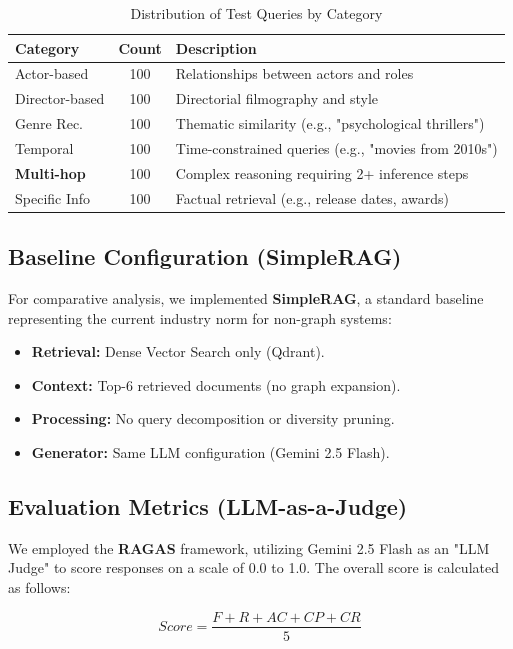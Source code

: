 \documentclass[a4paper, 12pt]{extreport}
\begin{document}
\begin{table}[h]
\centering
\caption{Distribution of Test Queries by Category}
\label{tab:test_dataset}
\begin{tabular}{|l|c|l|}
\hline
\textbf{Category} & \textbf{Count} & \textbf{Description} \\ \hline
Actor-based & 100 & Relationships between actors and roles \\ \hline
Director-based & 100 & Directorial filmography and style \\ \hline
Genre Rec. & 100 & Thematic similarity (e.g., "psychological thrillers") \\ \hline
Temporal & 100 & Time-constrained queries (e.g., "movies from 2010s") \\ \hline
\textbf{Multi-hop} & 100 & Complex reasoning requiring 2+ inference steps \\ \hline
Specific Info & 100 & Factual retrieval (e.g., release dates, awards) \\ \hline
\end{tabular}
\end{table}

\subsection{Baseline Configuration (SimpleRAG)}
For comparative analysis, we implemented \textbf{SimpleRAG}, a standard baseline representing the current industry norm for non-graph systems:
\begin{itemize}
    \item \textbf{Retrieval:} Dense Vector Search only (Qdrant).
    \item \textbf{Context:} Top-6 retrieved documents (no graph expansion).
    \item \textbf{Processing:} No query decomposition or diversity pruning.
    \item \textbf{Generator:} Same LLM configuration (Gemini 2.5 Flash).
\end{itemize}

\subsection{Evaluation Metrics (LLM-as-a-Judge)}
We employed the \textbf{RAGAS} framework, utilizing Gemini 2.5 Flash as an "LLM Judge" to score responses on a scale of 0.0 to 1.0. The overall score is calculated as follows:

\begin{equation}
    Score = \frac{F + R + AC + CP + CR}{5}
\end{equation}
\end{document}

